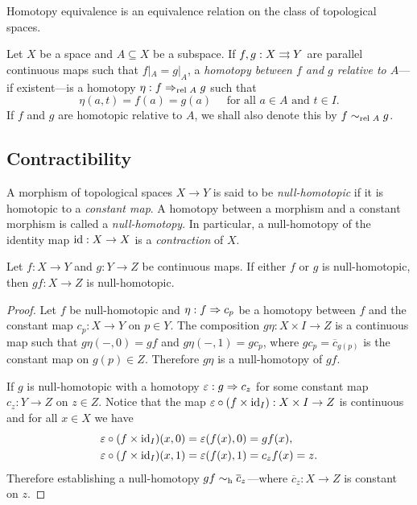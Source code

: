 \begin{corollary}
\label{cor:htpy-equiv-is-equiv-relation}
Homotopy equivalence is an equivalence relation on the class of topological
spaces.
\end{corollary}

\begin{definition}
\label{def:relative-homotopy}
Let \(X\) be a space and \(A \subseteq X\) be a subspace. If \(f, g: X \rightrightarrows Y\)
are parallel continuous maps such that \(f|_A = g|_A\), a \emph{homotopy between
  \(f\) and \(g\) relative to \(A\)}---if existent---is a homotopy
\(\eta: f \Rightarrow_{\text{rel }{A}} g\) such that
\[
\eta(a, t) = f(a) = g(a)\quad\text{ for all } a \in A \text{ and } t \in I.
\]
If \(f\) and \(g\) are homotopic relative to \(A\), we shall also denote this by
\(f \sim_{\text{rel }{A}} g\).
\end{definition}

\subsection{Contractibility}

\begin{definition}
\label{def:null-homotopy}
A morphism of topological spaces \(X \to Y\) is said to be \emph{null-homotopic}
if it is homotopic to a \emph{constant map}. A homotopy between a morphism and a
constant morphism is called a \emph{null-homotopy}. In particular, a null-homotopy of the identity map \(\operatorname{id}: X \to X\) is a \emph{contraction} of \(X\).
\end{definition}

\begin{proposition}
\label{prop:composition-null-homotopic-iff-some-is-null-homotopic}
Let \(f: X \to Y\) and \(g: Y \to Z\) be continuous maps. If either \(f\) or
\(g\) is null-homotopic, then \(g f: X \to Z\) is null-homotopic.
\end{proposition}

\begin{proof}
Let \(f\) be null-homotopic and \(\eta: f \Rightarrow c_p\) be a homotopy between \(f\)
and the constant map \(c_p: X \to Y\) on \(p \in Y\). The composition
\(g \eta: X \times I \to Z\) is a continuous map such that \(g\eta(-, 0) = g f\)
and \(g \eta(-, 1) = g c_p\), where \(g c_p = \overline{c}_{g(p)}\) is the
constant map on \(g(p) \in Z\). Therefore \(g \eta\) is a null-homotopy of
\(gf\).

If \(g\) is null-homotopic with a homotopy \(\varepsilon: g \Rightarrow c_z\) for some
constant map \(c_z: Y \to Z\) on \(z \in Z\). Notice that the map
\(\varepsilon \circ (f \times \operatorname{id}_I): X \times I \to Z\) is continuous and for
all \(x \in X\) we have
\begin{align*}
\varepsilon\circ (f \times \operatorname{id}_I)(x, 0)
&= \varepsilon(f(x), 0) = gf(x),    \\
\varepsilon\circ (f \times \operatorname{id}_I)(x, 1)
&= \varepsilon(f(x), 1) = c_z f(x) = z. \\
\end{align*}
Therefore establishing a null-homotopy \(g f \sim_{\text{h}} \overline{c}_z\)---where
\(\overline{c}_z: X \to Z\) is constant on \(z\).
\end{proof}

